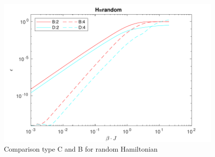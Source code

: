 \begin{figure}[H]
    \center
    \includegraphics[width=\textwidth]{Figuren/benchmarking/type5/ranodm.pdf}
    \caption{Comparison type C and B for random Hamiltonian}
\end{figure}


